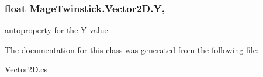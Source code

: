 \subsubsection[{Y}]{\setlength{\rightskip}{0pt plus 5cm}float Mage\+Twinstick.\+Vector2\+D.\+Y\hspace{0.3cm}{\ttfamily [get]}, {\ttfamily [set]}}\label{class_mage_twinstick_1_1_vector2_d_a0ae54e599156e7c295515bfc80834bfd}


autoproperty for the Y value 



The documentation for this class was generated from the following file\+:\begin{DoxyCompactItemize}
\item 
Vector2\+D.\+cs\end{DoxyCompactItemize}
